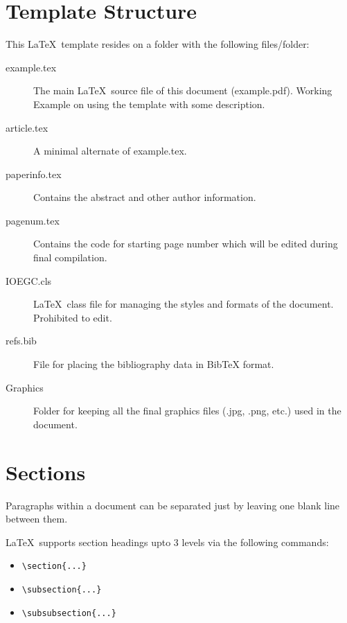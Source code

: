 \documentclass[fleqn, 10pt, twoside, blindreview]{IOEGC}
\begin{document}
\section{Template Structure} \label{sec:struct}
This \LaTeX\ template resides on a folder with the following files/folder:
\begin{description}
	\item[example.tex]		The main \LaTeX\ source file of this document (example.pdf). 
		Working Example on using the template with some description.
	\item[article.tex] A minimal alternate of example.tex.	
	\item[paperinfo.tex] Contains the abstract and other author information.
	\item[pagenum.tex]		Contains the code for starting page number which 
							will be edited during final compilation.
	\item[IOEGC.cls] 	\LaTeX\ class file for managing the styles and 
		formats of the document. Prohibited to edit.
	\item[refs.bib] 	File for placing the bibliography data in BibTeX format.
	\item[Graphics] 		Folder for keeping all the final graphics files 
							(.jpg, .png, etc.) used in the document.
\end{description}


\section{Sections}
Paragraphs within a document can be separated just by leaving one blank line 
between them.

\LaTeX\ supports section headings upto 3 levels via the following commands:

\begin{itemize}[noitemsep]
	\item \verb+\section{...}+
	\item \verb+\subsection{...}+
	\item \verb+\subsubsection{...}+
\end{itemize} 
\end{document}
